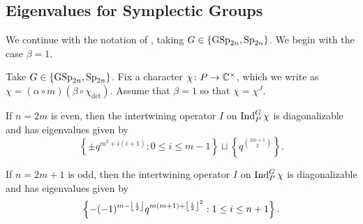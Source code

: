 \subsection{Eigenvalues for Symplectic Groups}
We continue with the notation of , taking $G\in\{\mathrm{GSp}_{2n},\mathrm{Sp}_{2n}\}$. We begin with the case $\beta=1$.
\begin{theorem}
    Take $G\in\{\mathrm{GSp}_{2n},\mathrm{Sp}_{2n}\}$. Fix a character $\chi\colon P\to\mathbb C^\times$, which we write as $\chi=(\alpha\circ m)(\beta\circ\chi_{\det})$. Assume that $\beta=1$ so that $\chi=\chi^J$.
    \begin{listalph}
        \item If $n=2m$ is even, then the intertwining operator $I$ on $\operatorname{Ind}_P^G\chi$ is diagonalizable and has eigenvalues given by
        \[\left\{\pm q^{m^2+i(i+1)}:0\le i\le m-1\right\}\sqcup\left\{q^{\binom{2m+1}2}\right\}.\]
        \item If $n=2m+1$ is odd, then the intertwining operator $I$ on $\operatorname{Ind}_P^G\chi$ is diagonalizable and has eigenvalues given by
        \[\left\{-(-1)^{m-\left\lfloor{\frac i2}\right\rfloor}q^{m(m+1)+\left\lfloor{\frac i2}\right\rfloor^2}:1\le i\le n+1\right\}.\]
    \end{listalph}
\end{theorem}
